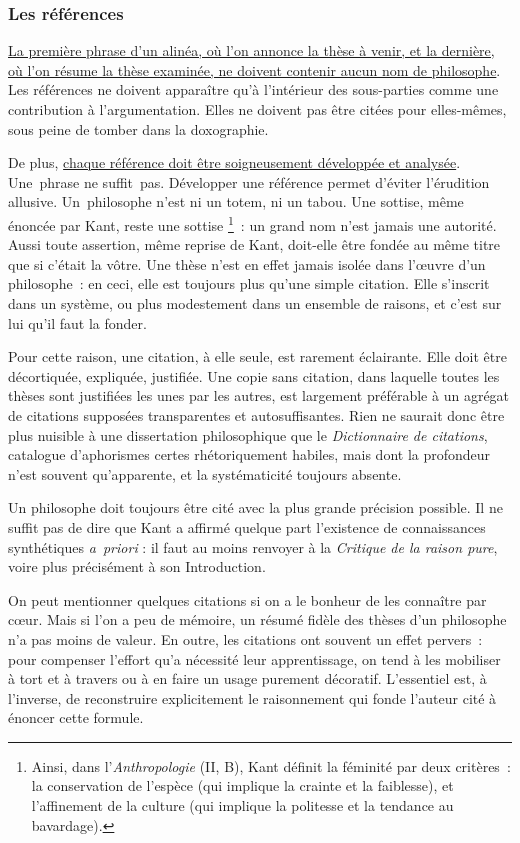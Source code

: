 \documentclass[a4paper,12pt]{article}
\begin{document}
\subsubsection{Les références}
\label{sec-3-2-3}

\uline{La première phrase d'un alinéa, où l'on annonce la thèse à venir, et la
dernière, où l'on résume la thèse examinée, ne doivent contenir aucun
nom de philosophe}. Les références ne doivent apparaître qu'à
l'intérieur des sous-parties comme une contribution à l'argumentation.
Elles ne doivent pas être citées pour elles-mêmes, sous peine de tomber
dans la doxographie.

De plus, \uline{chaque référence doit être soigneusement développée et
analysée}. Une phrase ne suffit pas. Développer une référence permet
d'éviter l'érudition allusive. Un philosophe n'est ni un totem, ni un
tabou. Une sottise, même énoncée par Kant, reste une sottise \footnote{Ainsi, dans l'\emph{Anthropologie} (II, B), Kant définit la féminité par
deux critères : la conservation de l'espèce (qui implique la crainte
et la faiblesse), et l'affinement de la culture (qui implique la
politesse et la tendance au bavardage).} : un
grand nom n'est jamais une autorité. Aussi toute assertion, même reprise
de Kant, doit-elle être fondée au même titre que si c'était la vôtre.
Une thèse n'est en effet jamais isolée dans l'œuvre d'un philosophe : en
ceci, elle est toujours plus qu'une simple citation. Elle s'inscrit dans
un système, ou plus modestement dans un ensemble de raisons, et c'est
sur lui qu'il faut la fonder.

Pour cette raison, une citation, à elle seule, est rarement éclairante.
Elle doit être décortiquée, expliquée, justifiée. Une copie sans
citation, dans laquelle toutes les thèses sont justifiées les unes par
les autres, est largement préférable à un agrégat de citations supposées
transparentes et autosuffisantes. Rien ne saurait donc être plus
nuisible à une dissertation philosophique que le \emph{Dictionnaire de
citations}, catalogue d'aphorismes certes rhétoriquement habiles, mais
dont la profondeur n'est souvent qu'apparente, et la systématicité
toujours absente.

Un philosophe doit toujours être cité avec la plus grande précision
possible. Il ne suffit pas de dire que Kant a affirmé quelque part
l'existence de connaissances synthétiques \emph{a priori} : il faut au moins
renvoyer à la \emph{Critique de la raison pure}, voire plus précisément à son
Introduction.

On peut mentionner quelques citations si on a le bonheur de les
connaître par cœur. Mais si l'on a peu de mémoire, un résumé fidèle des
thèses d'un philosophe n'a pas moins de valeur. En outre, les citations
ont souvent un effet pervers : pour compenser l'effort qu'a nécessité
leur apprentissage, on tend à les mobiliser à tort et à travers ou à en
faire un usage purement décoratif. L'essentiel est, à l'inverse, de
reconstruire explicitement le raisonnement qui fonde l'auteur cité à
énoncer cette formule.
\end{document}
